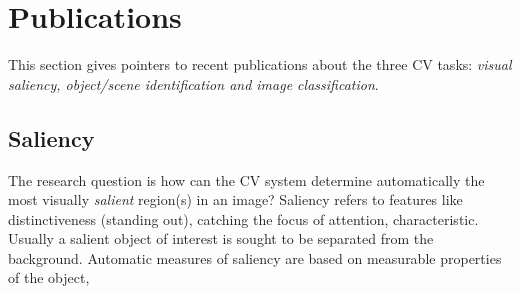 \section{Publications}
\label{sec:pubs}

This section gives pointers to recent publications about the three CV tasks:  {\em visual saliency, object/scene identification and image classification}.

\subsection{Saliency}

The research question is how can the CV system determine automatically the most visually {\em salient} region(s) in an image? Saliency refers to features like distinctiveness (standing out), catching the focus of attention, characteristic. Usually a salient object of interest is sought to be separated from the background. Automatic measures of saliency are based on measurable properties of the object,

